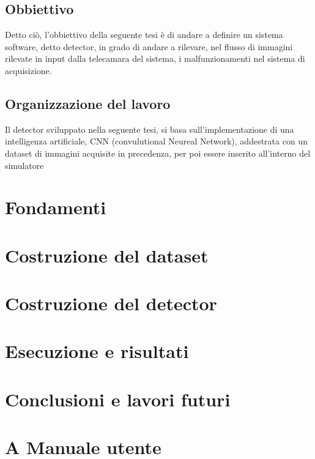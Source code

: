 \documentclass[14pt]{extarticle}
\begin{document}
\subsection{Obbiettivo}
Detto ciò, l'obbiettivo della seguente tesi è di andare a definire un sistema software, detto detector, in grado di andare a rilevare, nel flusso di immagini rilevate in input dalla telecamara del sistema, i malfunzionamenti nel sistema di acquisizione. 
\subsection{Organizzazione del lavoro} 
Il detector sviluppato nella seguente tesi, si basa sull'implementazione di una intelligenza artificiale, CNN (convulutional Neureal Network), addestrata con un dataset di immagini acquisite in  precedenza, per poi essere inserito all'interno del simulatore
\section{Fondamenti}


\section{Costruzione del dataset}

\section{Costruzione del detector}

\section{Esecuzione e risultati}

\section{Conclusioni e lavori futuri}

\section{A Manuale utente}
\end{document}
